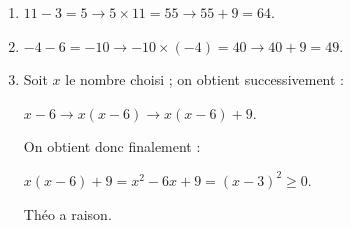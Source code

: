 
\medskip 

%

\begin{enumerate}
\item %
$11 - 3 = 5 \to 5 \times 11 = 55 \to 55 + 9 = 64$. 
\item %
$- 4 - 6 = - 10\to - 10 \times (- 4) = 40 \to 40 + 9 = 49$. 
\item %
Soit $x$ le nombre choisi ; on obtient successivement :

$x - 6 \to  x(x - 6)  \to  x(x - 6) + 9$.

On obtient donc finalement :

$x(x - 6) + 9 = x^2 - 6x + 9 = (x - 3)^2 \geqslant 0$.

Théo a raison. 
\end{enumerate}

\vspace{0.5cm}

